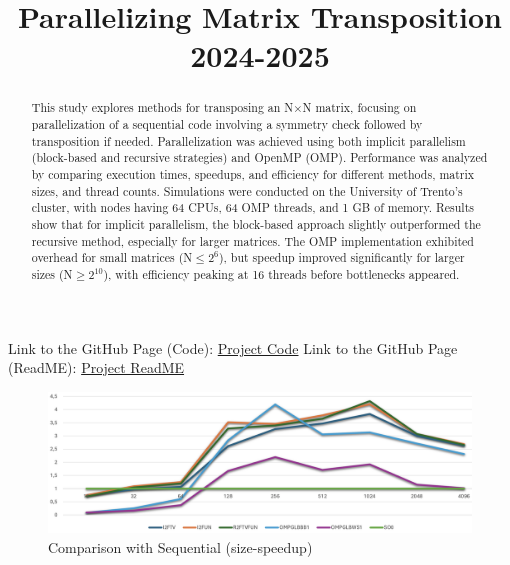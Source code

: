 \documentclass[conference]{IEEEtran}
\begin{document}
\title{Parallelizing Matrix Transposition 2024-2025}

\author{
}

\maketitle
\begin{abstract}
This study explores methods for transposing an N$\times$N matrix, focusing on parallelization of a sequential code involving a symmetry check followed by transposition if needed.
Parallelization was achieved using both implicit parallelism (block-based and recursive strategies) and OpenMP (OMP).
Performance was analyzed by comparing execution times, speedups, and efficiency for different methods, matrix sizes, and thread counts.
Simulations were conducted on the University of Trento’s cluster, with nodes having 64 CPUs, 64 OMP threads, and 1 GB of memory.
Results show that for implicit parallelism, the block-based approach slightly outperformed the recursive method, especially for larger matrices.
The OMP implementation exhibited overhead for small matrices (N$\leq 2^6$), but speedup improved significantly for larger sizes (N$\geq 2^{10}$), with efficiency peaking at 16 threads before bottlenecks appeared.
\end{abstract}

\printbibliography
Link to the GitHub Page (Code):
\href{https://github.com/Gotta003/Matteo_Gottardelli_Intro_Parco_H1-2024-2025/tree/main/Matrix_Transposition}{Project Code}
\newline Link to the GitHub Page (ReadME):
\href{https://github.com/Gotta003/Matteo_Gottardelli_Intro_Parco_H1-2024-2025/blob/main/README.md}{Project ReadME}
\begin{figure}[!h]
    \centering
    \includegraphics[width=1\columnwidth]{images/Image 1.02.png}
    \caption{Comparison with Sequential (size-speedup)}
    \label{fig:figure1}
\end{figure}
\end{document}

